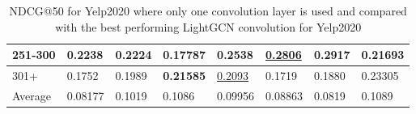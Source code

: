 \begin{table*}[]
\begin{tabular}{|l|l|l|l|l|l|l||l|}
        251-300     & 0.2238                         & 0.2224                         & 0.17787                        & 0.2538                         & \underline{0.2806}             & \textbf{0.2917}                 & 0.21693                    \\ \hline
        301+        & 0.1752                         & 0.1989                         & \textbf{0.21585}               & \underline{0.2093}             & 0.1719                         & 0.1880                          & 0.23305                    \\ \hline
        Average     & 0.08177                        & 0.1019                         & 0.1086                         & 0.09956                        & 0.08863                        & 0.0819                          & 0.1089                     \\ \hline
    \end{tabular}
    \caption{NDCG@50 for Yelp2020 where only one convolution layer is used and compared with the best performing LightGCN convolution for Yelp2020}
    \label{tab:yelp2020-ndcg-evaluation}
\end{table*}

